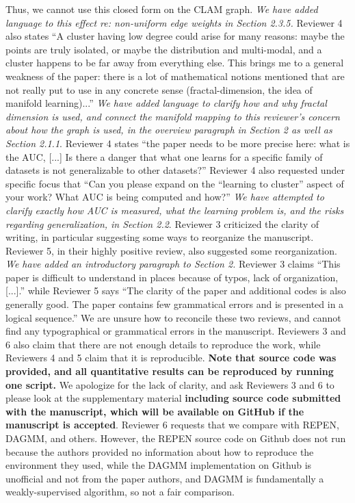 \documentclass{article}
\begin{document}
Thus, we cannot use this closed form on the CLAM graph.
\emph{We have added language to this effect re: non-uniform edge weights in Section 2.3.5.}
Reviewer 4 also states ``A cluster having low degree could arise for many reasons: maybe the points are truly isolated, or maybe the distribution and multi-modal, and a cluster happens to be far away from everything else. 
This brings me to a general weakness of the paper: there is a lot of mathematical notions mentioned that are not really put to use in any concrete sense (fractal-dimension, the idea of manifold learning)...''
\emph{We have added language to clarify how and why fractal dimension is used, and connect the manifold mapping to this reviewer's concern about how the graph is used, in the overview paragraph in Section 2 as well as Section 2.1.1}.
Reviewer 4 states ``the paper needs to be more precise here: what is the AUC, [...] Is there a danger that what one learns for a specific family of datasets is not generalizable to other datasets?''
Reviewer 4 also requested under specific focus that ``Can you please expand on the ``learning to cluster'' aspect of your work? What AUC is being computed and how?''
\emph{We have attempted to clarify exactly how AUC is measured, what the learning problem is, and the risks regarding generalization, in Section 2.2}.
Reviewer 3 criticized the clarity of writing, in particular suggesting some ways to reorganize the manuscript.
Reviewer 5, in their highly positive review, also suggested some reorganization.
\emph{We have added an introductory paragraph to Section 2.}
Reviewer 3 claims ``This paper is difficult to understand in places because of typos, lack of organization, [...].'' while Reviewer 5 says ``The clarity of the paper and additional codes is also generally good. The paper contains few grammatical errors and is presented in a logical sequence.''
We are unsure how to reconcile these two reviews, and cannot find any typographical or grammatical errors in the manuscript.
Reviewers 3 and 6 also claim that there are not enough details to reproduce the work, while Reviewers 4 and 5 claim that it is reproducible.
\textbf{Note that source code was provided, and all quantitative results can be reproduced by running one script.}
We apologize for the lack of clarity, and ask Reviewers 3 and 6 to please look at the supplementary material \textbf{including source code submitted with the manuscript, which will be available on GitHub if the manuscript is accepted}.
Reviewer 6 requests that we compare with REPEN, DAGMM, and others.
However, the REPEN source code on Github does not run because the authors provided no information about how to reproduce the environment they used, while the DAGMM implementation on Github is unofficial and not from the paper authors, and DAGMM is fundamentally a weakly-supervised algorithm, so not a fair comparison.
\end{document}
